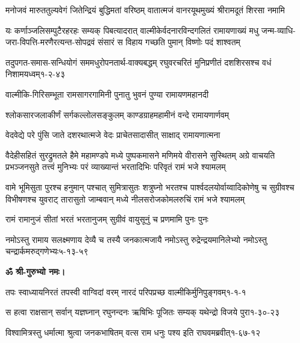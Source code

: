 \fourlineindentedshloka
{मनोजवं मारुततुल्यवेगं}
{जितेन्द्रियं बुद्धिमतां वरिष्ठम्}
{वातात्मजं वानरयूथमुख्यं}
{श्रीरामदूतं शिरसा नमामि}

\resetShloka

\fourlineindentedshloka
{यः कर्णाञ्जलिसम्पुटैरहरहः सम्यक् पिबत्यादरात्}
{वाल्मीकेर्वदनारविन्दगलितं रामायणाख्यं मधु}
{जन्म-व्याधि-जरा-विपत्ति-मरणैरत्यन्त-सोपद्रवं}
{संसारं स विहाय गच्छति पुमान् विष्णोः पदं शाश्वतम्}

\annofourlineindentedshloka
{तदुपगत-समास-सन्धियोगं}
{सममधुरोपनतार्थ-वाक्यबद्धम्}
{रघुवरचरितं मुनिप्रणीतं}
{दशशिरसश्च वधं निशामयध्वम्}{१-२-४३}

\twolineshloka
{वाल्मीकि-गिरिसम्भूता रामसागरगामिनी}
{पुनातु भुवनं पुण्या रामायणमहानदी}

\twolineshloka
{श्लोकसारजलाकीर्णं सर्गकल्लोलसङ्कुलम्}
{काण्डग्राहमहामीनं वन्दे रामायणार्णवम्}

\twolineshloka
{वेदवेद्ये परे पुंसि जाते दशरथात्मजे}
{वेदः प्राचेतसादासीत् साक्षाद् रामायणात्मना}

\resetShloka
{}

\fourlineindentedshloka
{वैदेहीसहितं सुरद्रुमतले हैमे महामण्डपे}
{मध्ये पुष्पकमासने मणिमये वीरासने सुस्थितम्}
{अग्रे वाचयति प्रभञ्जनसुते तत्त्वं मुनिभ्यः परं}
{व्याख्यान्तं भरतादिभिः परिवृतं रामं भजे श्यामलम्}

\fourlineindentedshloka
{वामे भूमिसुता पुरश्च हनुमान् पश्चात् सुमित्रासुतः}
{शत्रुघ्नो भरतश्च पार्श्वदलयोर्वाय्वादिकोणेषु च}
{सुग्रीवश्च विभीषणश्च युवराट् तारासुतो जाम्बवान्}
{मध्ये नीलसरोजकोमलरुचिं रामं भजे श्यामलम्}

\twolineshloka
{रामं रामानुजं सीतां भरतं भरतानुजम्}
{सुग्रीवं वायुसूनुं च प्रणमामि पुनः पुनः}

\annofourlineindentedshloka
{नमोऽस्तु रामाय सलक्ष्मणाय}
{देव्यै च तस्यै जनकात्मजायै}
{नमोऽस्तु रुद्रेन्द्रयमानिलेभ्यो}
{नमोऽस्तु चन्द्रार्कमरुद्गणेभ्यः}{५-१३-५९}

\centerline{\textbf{ॐ श्री-गुरुभ्यो नमः।}}

\resetShloka
{}
\annotwolineshloka
{तपः स्वाध्यायनिरतं तपस्वी वाग्विदां वरम्}
{नारदं परिपप्रच्छ वाल्मीकिर्मुनिपुङ्गवम्}{१-१-१}

\annotwolineshloka
{स हत्वा राक्षसान् सर्वान् यज्ञघ्नान् रघुनन्दनः}
{ऋषिभिः पूजितः सम्यक् यथेन्द्रो विजये पुरा}{१-३०-२३}

\annotwolineshloka
{विश्वामित्रस्तु धर्मात्मा श्रुत्वा जनकभाषितम्}
{वत्स राम धनुः पश्य इति राघवमब्रवीत्}{१-६७-१२}

